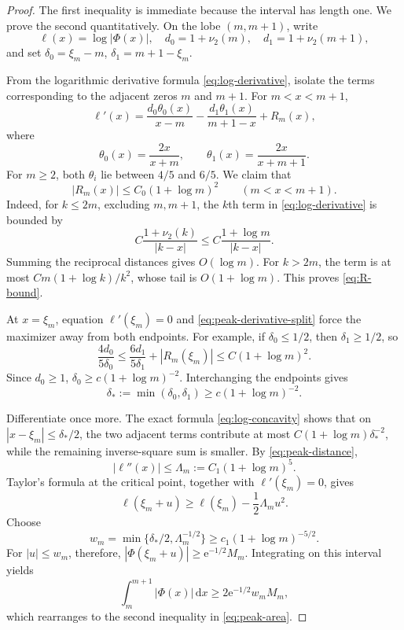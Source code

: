 \documentclass[11pt,oneside]{article}
\numberwithin{equation}{section}
\theoremstyle{definition}
\theoremstyle{remark}
\newcommand{\e}{\mathrm e}
\newcommand{\dd}{\,\mathrm d}
\newcommand{\abs}[1]{\left|#1\right|}
\newcommand{\PhiUp}{\Phi}
\newcommand{\nuTwo}{\nu_2}
\newcommand{\defeq}{\mathrel{:=}}
\begin{document}
\begin{proof}
The first inequality is immediate because the interval has length one.  We prove the
second quantitatively.  On the lobe \((m,m+1)\), write
\[
 \ell(x)=\log\abs{\PhiUp(x)},
 \quad d_0=1+\nuTwo(m),
 \quad d_1=1+\nuTwo(m+1),
\]
and set
\(\delta_0=\xi_m-m\), \(\delta_1=m+1-\xi_m\).

From the logarithmic derivative formula \eqref{eq:log-derivative}, isolate the terms
corresponding to the adjacent zeros \(m\) and \(m+1\).  For \(m<x<m+1\),
\begin{equation}
 \ell'(x)
 =\frac{d_0\theta_0(x)}{x-m}
  -\frac{d_1\theta_1(x)}{m+1-x}+R_m(x),
 \label{eq:peak-derivative-split}
\end{equation}
where
\[
 \theta_0(x)=\frac{2x}{x+m},
 \qquad
 \theta_1(x)=\frac{2x}{x+m+1}.
\]
For \(m\ge2\), both \(\theta_i\) lie between \(4/5\) and \(6/5\).
We claim that
\begin{equation}
 \abs{R_m(x)}\le C_0(1+\log m)^2
 \qquad(m<x<m+1).
 \label{eq:R-bound}
\end{equation}
Indeed, for \(k\le2m\), excluding \(m,m+1\), the \(k\)th term in
\eqref{eq:log-derivative} is bounded by
\[
 C\frac{1+\nuTwo(k)}{|k-x|}
 \le C\frac{1+\log m}{|k-x|}.
\]
Summing the reciprocal distances gives \(O(\log m)\).  For \(k>2m\), the term is at most
\(Cm(1+\log k)/k^2\), whose tail is \(O(1+\log m)\).  This proves
\eqref{eq:R-bound}.

At \(x=\xi_m\), equation \(\ell'(\xi_m)=0\) and
\eqref{eq:peak-derivative-split} force the maximizer away from both endpoints.  For example,
if \(\delta_0\le1/2\), then \(\delta_1\ge1/2\), so
\[
 \frac{4d_0}{5\delta_0}
 \le \frac{6d_1}{5\delta_1}+|R_m(\xi_m)|
 \le C(1+\log m)^2.
\]
Since \(d_0\ge1\), \(\delta_0\ge c(1+\log m)^{-2}\).  Interchanging the endpoints gives
\begin{equation}
 \delta_*\defeq\min(\delta_0,\delta_1)
 \ge c(1+\log m)^{-2}.
 \label{eq:peak-distance}
\end{equation}

Differentiate once more.  The exact formula \eqref{eq:log-concavity} shows that on
\(|x-\xi_m|\le\delta_*/2\), the two adjacent terms contribute at most
\(C(1+\log m)\delta_*^{-2}\), while the remaining inverse-square sum is smaller.  By
\eqref{eq:peak-distance},
\begin{equation}
 |\ell''(x)|\le \Lambda_m\defeq C_1(1+\log m)^5.
 \label{eq:peak-curvature}
\end{equation}
Taylor's formula at the critical point, together with \(\ell'(\xi_m)=0\), gives
\[
 \ell(\xi_m+u)\ge\ell(\xi_m)-\frac12\Lambda_mu^2.
\]
Choose
\[
 w_m=\min\{\delta_*/2,\Lambda_m^{-1/2}\}
 \ge c_1(1+\log m)^{-5/2}.
\]
For \(|u|\le w_m\), therefore,
\(\abs{\PhiUp(\xi_m+u)}\ge\e^{-1/2}M_m\).  Integrating on this interval yields
\[
 \int_m^{m+1}\abs{\PhiUp(x)}\dd x
 \ge2\e^{-1/2}w_mM_m,
\]
which rearranges to the second inequality in \eqref{eq:peak-area}.
\end{proof}
\end{document}
